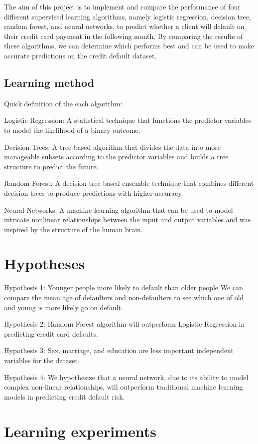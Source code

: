 \documentclass[nohyperref]{article}
\theoremstyle{plain}
\theoremstyle{definition}
\theoremstyle{remark}
\begin{document}
The aim of this project is to implement and compare the performance of four different supervised learning algorithms, namely logistic regression, decision tree, random forest, and neural networks, to predict whether a client will default on their credit card payment in the following month. By comparing the results of these algorithms, we can determine which performs best and can be used to make accurate predictions on the credit default dataset. \
\subsection{Learning method}
Quick definition of the each algorithm:

Logistic Regression: A statistical technique that functions the predictor variables to model the likelihood of a binary outcome.

Decision Trees: A tree-based algorithm that divides the data into more manageable subsets according to the predictor variables and builds a tree structure to predict the future.

Random Forest: A decision tree-based ensemble technique that combines different decision trees to produce predictions with higher accuracy.

Neural Networks: A machine learning algorithm that can be used to model intricate nonlinear relationships between the input and output variables and was inspired by the structure of the human brain.
\section{Hypotheses}
Hypothesis 1:
Younger people more likely to default than older people
We can compare the mean age of defaulters and non-defaulters to see which one of old and young is more likely go on default.

Hypothesis 2:
Random Forest algorithm will outperform Logistic Regression in predicting credit card defaults.

Hypothesis 3:
Sex, marriage, and education are less important independent variables for the dataset. 

Hypothesis 4:
We hypothesize that a neural network, due to its ability to model complex non-linear relationships, will outperform traditional machine learning models in predicting credit default risk. 
\section{Learning experiments}
\end{document}
